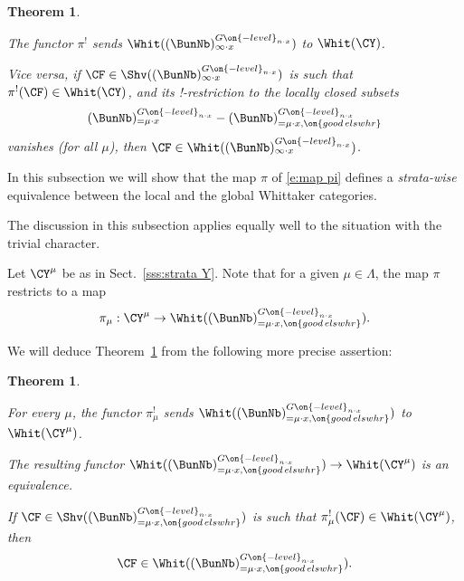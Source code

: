 \documentclass[9pt]{amsart}
\newtheorem{thm}[subsubsection]{Theorem}
\theoremstyle{definition}
\theoremstyle{remark}
\newcommand{\thmref}[1]{Theorem~\ref{#1}}
\newcommand{\secref}[1]{Sect.~\ref{#1}}
\numberwithin{equation}{section}
\begin{document}
\begin{thm}  \label{t:loc pullback} \hfill

\smallskip

The functor $\pi^!$ sends $\Whit((\BunNb)^{G\on{-level}_{n\cdot x}}_{\infty\cdot x})$ to $\Whit(\CY)$.

\smallskip

Vice versa, if $\CF\in \Shv((\BunNb)^{G\on{-level}_{n\cdot x}}_{\infty\cdot x})$ is such that $\pi^!(\CF)\in \Whit(\CY)$,
and its !-restriction to the locally closed subsets
$$(\BunNb)^{G\on{-level}_{n\cdot x}}_{=\mu\cdot x}-
(\BunNb)^{G\on{-level}_{n\cdot x}}_{=\mu\cdot x,\on{good\,elswhr}}$$
vanishes (for all $\mu$), then $\CF\in \Whit((\BunNb)^{G\on{-level}_{n\cdot x}}_{\infty\cdot x})$.

\end{thm}


In this subsection we will show that the map $\pi$ of \eqref{e:map pi} defines a \emph{strata-wise} equivalence between
the local and the global Whittaker categories. 

\medskip

The discussion in this subsection applies equally well to the situation with the trivial character. 

\sssec{}

Let $\CY^\mu$ be as in \secref{sss:strata Y}. Note that for a given $\mu\in \Lambda$, the map $\pi$ restricts to a map
$$\pi_\mu:\CY^\mu\to \Whit((\BunNb)^{G\on{-level}_{n\cdot x}}_{=\mu\cdot x,\on{good\,elswhr}}).$$

\medskip

We will deduce \thmref{t:loc pullback} from the following more precise assertion:

\begin{thm}  \label{t:loc pullback mu} \hfill

\smallskip

 For every $\mu$, the functor $\pi_\mu^!$ sends 
$\Whit((\BunNb)^{G\on{-level}_{n\cdot x}}_{=\mu\cdot x,\on{good\,elswhr}})$ to $\Whit(\CY^\mu)$.

\smallskip

 The resulting functor 
$\Whit((\BunNb)^{G\on{-level}_{n\cdot x}}_{=\mu\cdot x,\on{good\,elswhr}})\to \Whit(\CY^\mu)$
is an equivalence.

\smallskip

 If $\CF\in \Shv((\BunNb)^{G\on{-level}_{n\cdot x}}_{=\mu\cdot x,\on{good\,elswhr}})$ is
such that $\pi_\mu^!(\CF)\in \Whit(\CY^\mu)$, then 
$$\CF\in \Whit((\BunNb)^{G\on{-level}_{n\cdot x}}_{=\mu\cdot x,\on{good\,elswhr}}).$$

\end{thm} 
\end{document}
